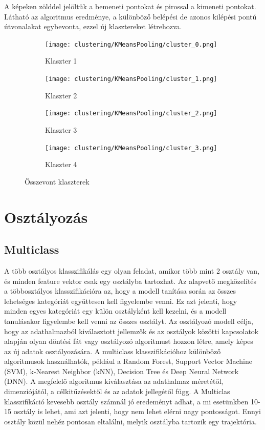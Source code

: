 \documentclass[12pt,a4paper]{article}
\begin{document}
A képeken zölddel jelöltük a bemeneti pontokat és pirossal a kimeneti pontokat. Látható az algoritmus eredménye, a különböző belépési de azonos kilépési pontú útvonalakat egybevonta, ezzel új klasztereket létrehozva.
\begin{figure}[ht]
    \centering
    \begin{subfigure}{0.45\textwidth}
        \centering
        \texttt{[image: clustering/KMeansPooling/cluster\_0.png]}
        \caption{Klaszter 1}
        \label{fig:cluster1}
    \end{subfigure}
    \hfill
    \begin{subfigure}{0.45\textwidth}
        \centering
        \texttt{[image: clustering/KMeansPooling/cluster\_1.png]}
        \caption{Klaszter 2}
        \label{fig:cluster2}
    \end{subfigure}
    \hfill
    \begin{subfigure}{0.45\textwidth}
        \centering
        \texttt{[image: clustering/KMeansPooling/cluster\_2.png]}
        \caption{Klaszter 3}
        \label{fig:cluster3}
    \end{subfigure}
    \hfill
    \begin{subfigure}{0.45\textwidth}
        \centering
        \texttt{[image: clustering/KMeansPooling/cluster\_3.png]}
        \caption{Klaszter 4}
        \label{fig:cluster4}
    \end{subfigure}
    \caption{Összevont klaszterek}
    \label{fig:pooledclusters}
\end{figure}

\newpage
\section{Osztályozás}
\subsection{Multiclass}
A több osztályos klasszifikálás egy olyan feladat, amikor több mint 2 osztály van, és minden feature vektor csak egy osztályba tartozhat. Az alapvető megközelítés a többosztályos klasszifikációra az, hogy a modell tanítása során az összes lehetséges kategóriát együttesen kell figyelembe venni. Ez azt jelenti, hogy minden egyes kategóriát egy külön osztályként kell kezelni, és a modell tanulásakor figyelembe kell venni az összes osztályt. Az osztályozó modell célja, hogy az adathalmazból kiválasztott jellemzők és az osztályok közötti kapcsolatok alapján olyan döntési fát vagy osztályozó algoritmust hozzon létre, amely képes az új adatok osztályozására. A multiclass klasszifikációhoz különböző algoritmusok használhatók, például a Random Forest, Support Vector Machine (SVM), k-Nearest Neighbor (kNN), Decision Tree és Deep Neural Network (DNN). A megfelelő algoritmus kiválasztása az adathalmaz méretétől, dimenziójától, a célkitűzésektől és az adatok jellegétől függ.
A Multiclas klasszifikáció kevesebb osztály számnál jó eredeményt adhat, a mi esetünkben 10-15 osztály is lehet, ami azt jelenti, hogy nem lehet elérni nagy pontosságot. Ennyi osztály közül nehéz pontosan eltalálni, melyik osztályba tartozik egy trajektória.
\end{document}
